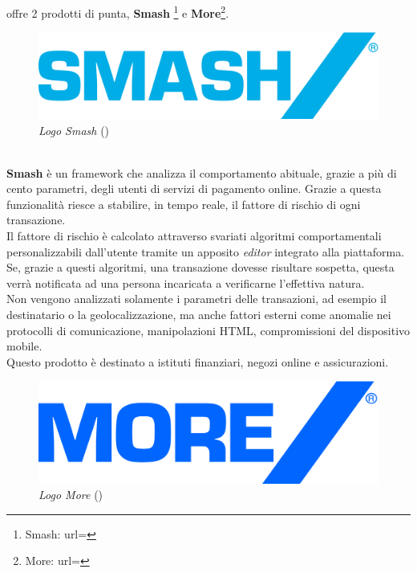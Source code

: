 \textit{\azienda} offre 2 prodotti di punta, \textbf{Smash\textregistered} \footnote{Smash: url= } e \textbf{More\textregistered}\footnote{More: url= }.\\
\begin{figure}[h!]
	\centering
	\includegraphics[scale=0.1]{immagini/smash.png}
	\caption{\textit{Logo Smash\textregistered} ()}
\end{figure}
\\
\textbf{Smash\textregistered} è un \gls{framework} che analizza il comportamento abituale, grazie a più di cento parametri, degli utenti di servizi di pagamento online. Grazie a questa funzionalità riesce a stabilire, in tempo reale, il fattore di rischio di ogni transazione.\\
Il fattore di rischio è calcolato attraverso svariati algoritmi comportamentali personalizzabili dall'utente tramite un apposito \textit{editor} integrato alla piattaforma. Se, grazie a questi algoritmi, una transazione dovesse risultare sospetta, questa verrà notificata ad una persona incaricata a verificarne l'effettiva natura.\\
Non vengono analizzati solamente i parametri delle transazioni, ad esempio il destinatario o la geolocalizzazione, ma anche fattori esterni come anomalie nei protocolli di comunicazione, manipolazioni HTML, compromissioni del dispositivo mobile.\\
Questo prodotto è destinato a istituti finanziari, negozi online e assicurazioni.\\
\begin{figure}[h!]
	\centering
	\includegraphics[scale=0.1]{immagini/more.png}
	\caption{\textit{Logo More\textregistered} ()}
\end{figure}
